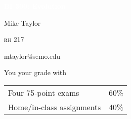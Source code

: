 \documentclass[t]{beamer}
\begin{document}
	

{
	\begin{frame}[t]{\textcolor{white}{\textbf{BI 300: Evolution}}}
\end{frame}
}

{
\begin{frame}[t,plain]
\large
\vspace{5ex}
\hangpara\hspace{17em} Mike Taylor

\hangpara\hspace{17em} \textsc{rh} 217

\hangpara\hspace{17em} mtaylor@semo.edu


\end{frame}
}



%
%
%
%
%


\begin{frame}[t]{You  your grade with}
	\begin{center}\large\begin{tabular}{@{}ll@{}}
	Four 75-point exams & 60\% \\[1ex]
	Home/in-class assignments & 40\% \\
	\end{tabular}
	\end{center}
\end{frame}
\end{document}
